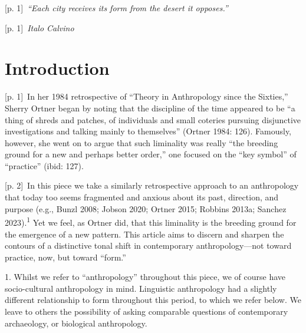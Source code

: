 \documentclass[10pt,a4paper]{article}
\begin{document}
{\scriptsize\color{gray} [p. 1]}\ \textit{“Each city receives its form from the desert it opposes.”}\par
{\scriptsize\color{gray} [p. 1]}\ \textit{Italo Calvino}\par
{}\section*{Introduction}
{\scriptsize\color{gray} [p. 1]}\ In her 1984 retrospective of “Theory in Anthropology since the Sixties,” Sherry Ortner began by noting that the discipline of the time appeared to be “a thing of shreds and patches, of individuals and small coteries pursuing disjunctive investigations and talking mainly to themselves” (Ortner 1984: 126). Famously, however, she went on to argue that such liminality was really “the breeding ground for a new and perhaps better order,” one focused on the “key symbol” of “practice” (ibid: 127).\par
{\scriptsize\color{gray} [p. 2]}\ In this piece we take a similarly retrospective approach to an anthropology that today too seems fragmented and anxious about its past, direction, and purpose (e.g., Bunzl 2008; Jobson 2020; Ortner 2015; Robbins 2013a; Sanchez 2023).\textsuperscript{1} Yet we feel, as Ortner did, that this liminality is the breeding ground for the emergence of a new pattern. This article aims to discern and sharpen the contours of a distinctive tonal shift in contemporary anthropology—not toward practice, now, but toward “form.”\par{\small 1. Whilst we refer to “anthropology” throughout this piece, we of course have socio-cultural anthropology in mind. Linguistic anthropology had a slightly different relationship to form throughout this period, to which we refer below. We leave to others the possibility of asking comparable questions of contemporary archaeology, or biological anthropology.\par}
\end{document}
